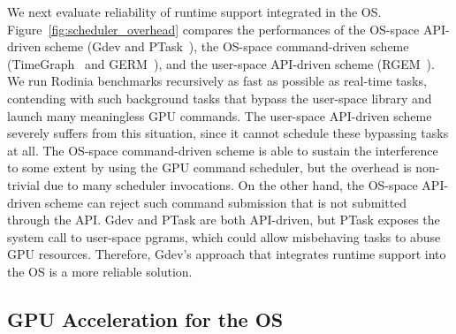 We next evaluate reliability of runtime support integrated in the OS.
Figure~\ref{fig:scheduler_overhead} compares the performances of the
OS-space API-driven scheme (Gdev and PTask~\cite{Rossbach_SOSP11}),
the OS-space command-driven scheme (TimeGraph~\cite{Kato_ATC11} and
GERM~\cite{Bautin_MCNC08}), and the user-space API-driven scheme
(RGEM~\cite{Kato_RTSS11}).
We run Rodinia benchmarks recursively as fast as possible as
real-time tasks, contending with such background tasks that bypass the
user-space library and launch many meaningless GPU commands.
The user-space API-driven scheme severely suffers from this situation,
since it cannot schedule these bypassing tasks at all.
The OS-space command-driven scheme is able to sustain the interference
to some extent by using the GPU command scheduler, but the overhead is
non-trivial due to many scheduler invocations.
On the other hand, the OS-space API-driven scheme can reject such command
submission that is not submitted through the API.
Gdev and PTask are both API-driven, but PTask exposes the system call to
user-space pgrams, which could allow misbehaving tasks to abuse GPU
resources.
Therefore, Gdev's approach that integrates runtime support into
the OS is a more reliable solution.

\vspace{-0.25em}
\subsection{GPU Acceleration for the OS}
\vspace{-0.25em}

